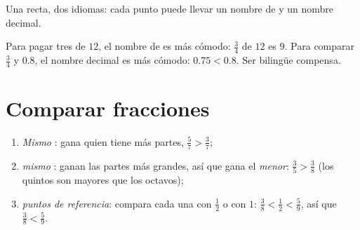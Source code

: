 \begin{omfigure}

{\small Una recta, dos idiomas: cada punto puede llevar un nombre de 
y un nombre decimal.}
\end{omfigure}

\begin{example}\label{ex:g5:fractions:choose}
Para pagar tres  de $12$, el nombre de  es más cómodo:
$\frac34$ de $12$ es $9$. Para comparar $\frac34$ y $0.8$, el
nombre decimal es más cómodo: $0.75 < 0.8$. Ser bilingüe compensa.
\end{example}

\section{Comparar fracciones}

\begin{method}\label{met:g5:fractions:compare}
\begin{enumerate}
  \item \emph{Mismo }: gana quien tiene más partes,
        $\frac57 > \frac37$;
  \item \emph{mismo }: ganan las partes más grandes, así que gana el
         \emph{menor}: $\frac35 > \frac38$ (los quintos son mayores
        que los octavos);
  \item \emph{puntos de referencia}: compara cada una con $\frac12$ o con $1$:
        $\frac38 < \frac12 < \frac59$, así que $\frac38 < \frac59$.
\end{enumerate}
\end{method}

